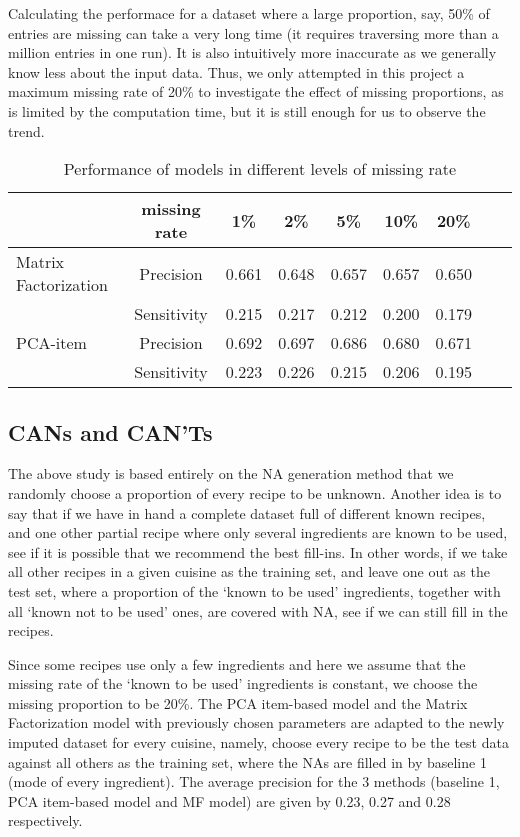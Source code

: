 \documentclass{article}
\begin{document}
Calculating the performace for a dataset where a large proportion, say, 50\% of entries are missing can take a very long time (it requires traversing more than a million entries in one run). It is also intuitively more inaccurate as we generally know less about the input data. Thus, we only attempted in this project a maximum missing rate of 20\%  to investigate the effect of missing proportions, as is limited by the computation time, but it is still enough for us to observe the trend.

\begin{table}[htb]
\centering
\vskip -9mm
\begin{center}
\begin{tabular}{lcccccccc}
\hline

&missing rate& 1\% & 2\% & 5\% & 10\% & 20\%\\
\hline
Matrix Factorization&Precision & 0.661 & 0.648&0.657&0.657&0.650 
\\
&Sensitivity & 0.215 & 0.217 & 0.212&0.200&0.179 \\
\hline
PCA-item&Precision &0.692&0.697&0.686&0.680&0.671 

\\
&Sensitivity &0.223&0.226&0.215&0.206&0.195 
\\
\hline
\end{tabular}
\vskip 1mm
\caption{Performance of models in different levels of missing rate}
\label{Performance of models}
\end{center}
\vskip -9mm
\end{table}

\subsection{CANs and CAN’Ts}
The above study is based entirely on the NA generation method that we randomly choose a proportion of every recipe to be unknown. Another idea is to say that if we have in hand a complete dataset full of different known recipes, and one other partial recipe where only several ingredients are known to be used, see if it is possible that we recommend the best fill-ins. In other words, if we take all other recipes in a given cuisine as the training set, and leave one out as the test set, where a proportion of the ‘known to be used’ ingredients, together with all ‘known not to be used’ ones, are covered with NA, see if we can still fill in the recipes. 

Since some recipes use only a few ingredients and here we assume that the missing rate of the ‘known to be used’ ingredients is constant, we choose the missing proportion to be 20\%. The PCA item-based model and the Matrix Factorization model with previously chosen parameters are adapted to the newly imputed dataset for every cuisine, namely, choose every recipe to be the test data against all others as the training set, where the NAs are filled in by baseline 1 (mode of every ingredient). The average precision for the 3 methods (baseline 1, PCA item-based model and MF model) are given by 0.23, 0.27 and 0.28 respectively.
\end{document}
